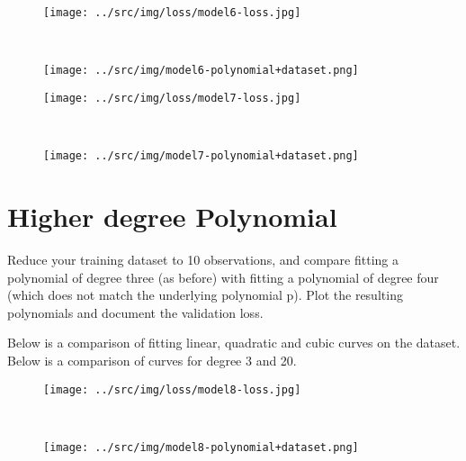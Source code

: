 \documentclass[a4paper,12pt]{article} %
\begin{document}
	\begin{figure}[H]
		\begin{minipage}[t]{.5\textwidth}
			\centering
			\texttt{[image: ../src/img/loss/model6-loss.jpg]}
			\label{fig:model6-loss}
		\end{minipage}
		~
		\begin{minipage}[t]{.5\textwidth}
			\centering
			\texttt{[image: ../src/img/model6-polynomial+dataset.png]}
			\label{fig:model6-polynomial+dataset}
		\end{minipage}
	\end{figure}
	
	\begin{figure}[H]
		\begin{minipage}[t]{.5\textwidth}
			\centering
			\texttt{[image: ../src/img/loss/model7-loss.jpg]}
			\label{fig:model7-loss}
		\end{minipage}
		~
		\begin{minipage}[t]{.5\textwidth}
			\centering
			\texttt{[image: ../src/img/model7-polynomial+dataset.png]}
			\label{fig:model7-polynomial+dataset}
		\end{minipage}
	\end{figure}
	
	
	\section{Higher degree Polynomial}
	Reduce your training dataset to 10 observations, and compare fitting a 
	polynomial of degree three (as before) with fitting a polynomial of degree 
	four (which does not match the underlying polynomial p). Plot the resulting 
	polynomials and document the validation loss.
	
	Below is a comparison of fitting linear, quadratic and cubic curves on the 
	dataset.
	Below is a comparison of curves for degree 3 and 20.
	\begin{figure}[H]
		\begin{minipage}[t]{.5\textwidth}
			\centering
			\texttt{[image: ../src/img/loss/model8-loss.jpg]}
			\label{fig:model8-loss}
		\end{minipage}
		~
		\begin{minipage}[t]{.5\textwidth}
			\centering
			\texttt{[image: ../src/img/model8-polynomial+dataset.png]}
			\label{fig:model8-polynomial+dataset}
		\end{minipage}
	\end{figure}
	
	
\end{document}
